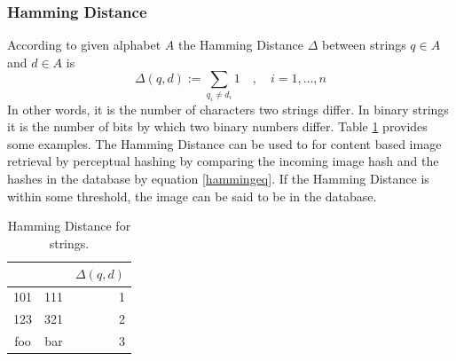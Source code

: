 \documentclass[english,12pt,a4paper,pdftex,elec,utf8, table]{aaltothesis}
\begin{document}
\subsubsection{Hamming Distance}\label{HammingSection}
According to \cite{Hamming1950} given alphabet $A$ the Hamming Distance $\Delta$ between strings $q \in A$ and $d \in A$ is
\begin{equation}\label{hammingeq}
\Delta(q,d):=\sum_{q_i\neq d_i}1\quad,\quad i=1,\ldots,n
\end{equation}
In other words, it is the number of characters two strings differ. In binary strings it is the number of bits by which two binary numbers differ. Table \ref{hammingexamples} provides some examples. The Hamming Distance can be used to for content based image retrieval by perceptual hashing by comparing the incoming image hash and the hashes in the database by equation \ref{hammingeq}. If the Hamming Distance is within some threshold, the image can be said to be in the database.

\begin{table}[htb]
\caption{Hamming Distance for strings.}
\label{hammingexamples}
\begin{center}
  \begin{tabular}{ccr}
&&$\Delta(q,d)$\\
    \hline \hline
    101 & 111 & 1\\
    \hline
    123 & 321 & 2\\
    \hline
    foo & bar & 3\\
    \hline
\end{tabular}
\end{center}\end{table}
\end{document}
